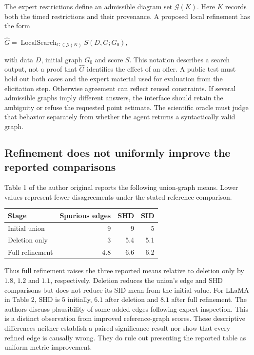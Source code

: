 The expert restrictions define an admissible diagram set $\mathcal{G}(K)$.
Here $K$ records both the timed restrictions and their provenance. A proposed
local refinement has the form
\begin{center}
$\widehat G=\operatorname{LocalSearch}_{G\in\mathcal{G}(K)}
S(D,G;G_0)$,
\end{center}
with data $D$, initial graph $G_0$ and score $S$. This notation
describes a search output, not a proof that $\widehat G$ identifies the effect
of an offer. A public test must hold out both cases and the expert material used
for evaluation from the elicitation step. Otherwise agreement can reflect
reused constraints. If several admissible graphs imply different answers, the
interface should retain the ambiguity or refuse the requested point estimate.
The scientific oracle must judge that behavior separately from whether the
agent returns a syntactically valid graph.~\citep{exec24_ecmo_reference}

\subsection{Refinement does not uniformly improve the reported comparisons}
Table 1 of the author original reports the following union-graph means. Lower
values represent fewer disagreements under the stated reference comparison.
\citep{exec24_ecmo_original}
\begin{center}
\begin{tabular}{lrrr}
\toprule
Stage & Spurious edges & SHD & SID \\
\midrule
Initial union & 9 & 9 & 5 \\
Deletion only & 3 & 5.4 & 5.1 \\
Full refinement & 4.8 & 6.6 & 6.2 \\
\bottomrule
\end{tabular}
\end{center}
Thus full refinement raises the three reported means relative to deletion only
by $1.8$, $1.2$ and $1.1$, respectively. Deletion reduces the union's edge and
SHD comparisons but does not reduce its SID mean from the initial value.
For LLaMA in Table 2, SHD is $5$ initially, $6.1$ after deletion and $8.1$
after full refinement. The authors discuss plausibility of some added edges
following expert inspection. This is a distinct observation from improved
reference-graph scores. These descriptive differences neither establish a
paired significance result nor show that every refined edge is causally wrong.
They do rule out presenting the reported table as uniform metric improvement.
\citep{exec24_ecmo_original,exec24_ecmo_reference}

